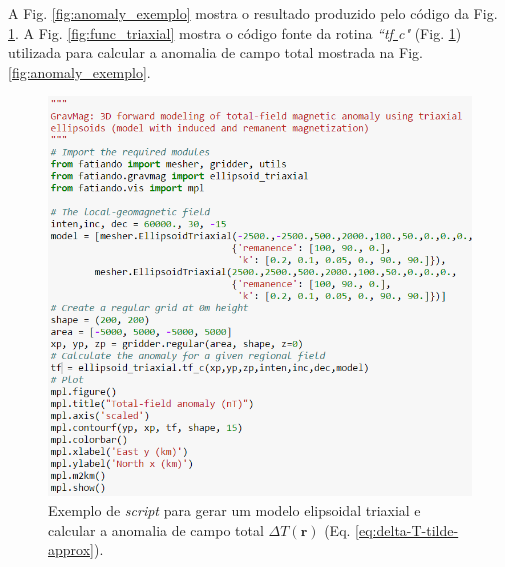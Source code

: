 A Fig. \ref{fig:anomaly_exemplo} mostra o resultado produzido pelo código da Fig. \ref{fig:Cookbook_Triaxial}. A Fig. \ref{fig:func_triaxial} mostra o código fonte da rotina \textit{``tf\underline{ }c"} (Fig. \ref{fig:Cookbook_Triaxial}) utilizada para calcular a anomalia de campo total mostrada na Fig. \ref{fig:anomaly_exemplo}.

\begin{figure}[hbt!]
	\centering \includegraphics[width=16 cm,height=17 cm]{figures/Cookbook_Triaxial}
	\caption[Exemplo de \textit{script} para gerar um modelo elipsoidal triaxial e calcular a anomalia de campo total $\Delta T (\mathbf{r})$ (Eq. \ref{eq:delta-T-tilde-approx}).]{Exemplo de \textit{script} para gerar um modelo elipsoidal triaxial e calcular a anomalia de campo total $\Delta T (\mathbf{r})$ (Eq. \ref{eq:delta-T-tilde-approx}).}
	\label{fig:Cookbook_Triaxial}
\end{figure}

